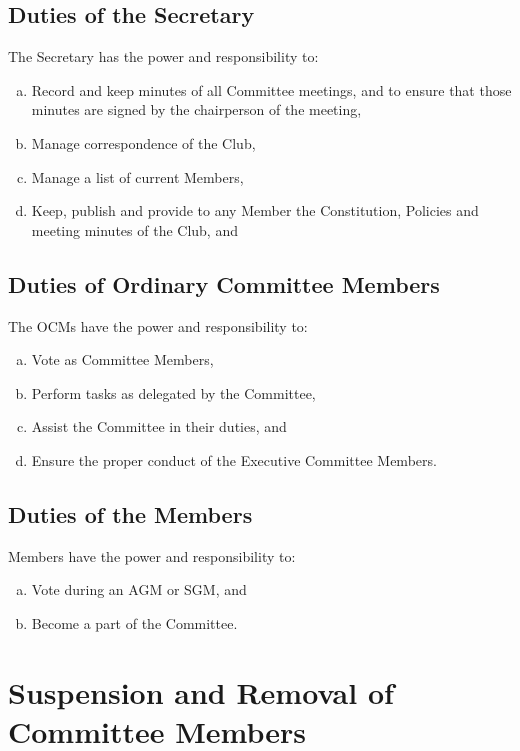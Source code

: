 \documentclass[a4paper,12pt]{article}
\begin{document}
\subsection{Duties of the Secretary}

The Secretary has the power and responsibility to:

\begin{enumerate}[a)]
	\item Record and keep minutes of all Committee meetings, and to ensure that those minutes are signed by the chairperson of the meeting,
	\item Manage correspondence of the Club,
	\item Manage a list of current Members,
	\item Keep, publish and provide to any Member the Constitution, Policies and meeting minutes of the Club, and
\end{enumerate}

\subsection{Duties of Ordinary Committee Members}

The OCMs have the power and responsibility to:

\begin{enumerate}[a)]
	\item Vote as Committee Members,
	\item Perform tasks as delegated by the Committee,
	\item Assist the Committee in their duties, and
	\item Ensure the proper conduct of the Executive Committee Members.
\end{enumerate}

\subsection{Duties of the Members}

Members have the power and responsibility to:

\begin{enumerate}[a)]
	\item Vote during an AGM or SGM, and
	\item Become a part of the Committee.
\end{enumerate}

\section{Suspension and Removal of Committee Members}
\end{document}
